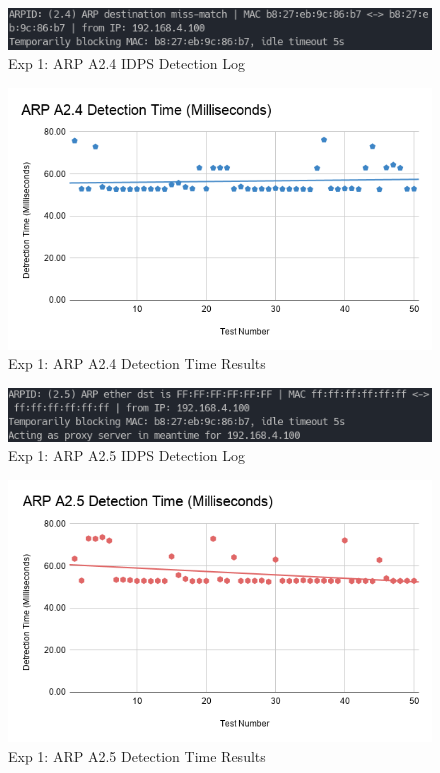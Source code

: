 \documentclass[12pt, oneside]{book}
\begin{document}
\begin{figure}[H]
	\centering
	\includegraphics[scale=0.7]{../tests/a24/IDPSCap.png}
	\caption{Exp 1: ARP A2.4 IDPS Detection Log}
	\label{fig:arpa24l}
\end{figure}
\begin{figure}[H]
	\centering
	\includegraphics[scale=0.65]{../tests/aAll/ARP_A2.4_Detection_Time_(Milliseconds)_.png}
	\caption{Exp 1: ARP A2.4 Detection Time Results}
	\label{fig:arpa24g}
\end{figure}

\begin{figure}[H]
	\centering
	\includegraphics[scale=0.7]{../tests/a25/IDPSCap.png}
	\caption{Exp 1: ARP A2.5 IDPS Detection Log}
	\label{fig:arpa25l}
\end{figure}
\begin{figure}[H]
	\centering
	\includegraphics[scale=0.65]{../tests/aAll/ARP_A2.5_Detection_Time_(Milliseconds)_.png}
	\caption{Exp 1: ARP A2.5 Detection Time Results}
	\label{fig:arpa25g}
\end{figure}
\end{document}
